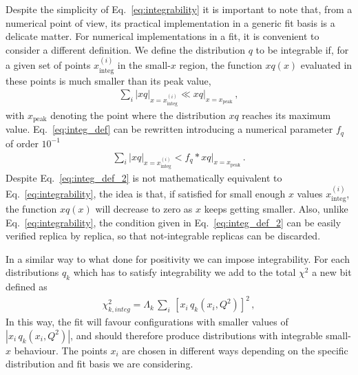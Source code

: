 %
Despite the simplicity of Eq.~\eqref{eq:integrability} it is important to note that, 
from a numerical point of view, its practical implementation in a generic fit basis is a delicate matter.
For numerical implementations in a fit, it is convenient to consider a different definition.
%
We define the distribution $q$ to be integrable if, for a given set of points $x^{(i)}_{\text{integ}}$ in the small-$x$ region,
the function $xq\left(x\right)$ evaluated in these points is much smaller than its peak value,
\begin{align}
    \label{eq:integ_def}
    \sum_i|xq|_{x=x^{(i)}_{\text{integ}}} \ll xq|_{x=x_{\text{peak}}}\,,
\end{align}
with $x_{\text{peak}}$ denoting the point where the distribution $xq$ reaches its maximum value.
Eq.~\eqref{eq:integ_def} can be rewritten introducing a numerical parameter $f_q$ of order $10^{-1}$
\begin{align}
    \label{eq:integ_def_2}
    \sum_i|xq|_{x=x^{(i)}_{\text{integ}}} < f_q*xq|_{x=x_{\text{peak}}}\,.
\end{align}
Despite Eq.~\eqref{eq:integ_def_2} is not mathematically equivalent to Eq.~\eqref{eq:integrability},
 the idea is that,
if satisfied for small enough $x$ values $x^{(i)}_{\text{integ}}$, the function $xq\left(x\right)$ will 
decrease to zero as $x$ keeps getting smaller. Also, unlike Eq.~\eqref{eq:integrability}, the condition given
in Eq.~\eqref{eq:integ_def_2} can be easily verified replica by replica, so that not-integrable replicas can be discarded.

%
In a similar way to what done for positivity we can impose integrability. For each distributions $q_k$ which has to satisfy integrability we
add to the total $\chi^2$ a new bit defined as  
\begin{align}
	\label{eq:chi2integ_k}
	\chi^2_{k,integ} = \Lambda_k \,\sum_i \,\left[x_i\,q_k\left(x_i,Q^2\right)\right]^2\,,
\end{align}
In this way, the fit will favour configurations with smaller values of $|x_i\,q_k\left(x_i,Q^2\right)|$, and should 
therefore produce distributions with integrable small-$x$ behaviour. The points $x_i$ are chosen in different ways depending
on the specific distribution and fit basis we are considering. 


